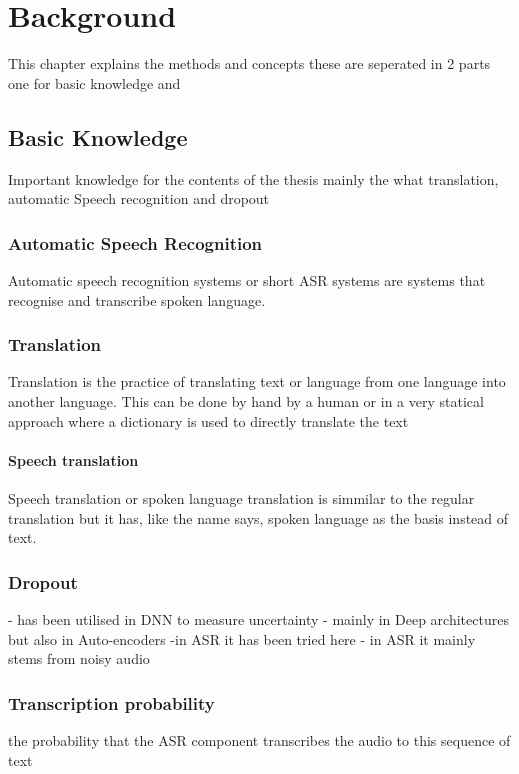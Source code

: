 \chapter{Background}
This chapter explains the methods and concepts these are seperated in 2 parts one for basic knowledge and 

\section{Basic Knowledge}
Important knowledge for the contents of the thesis mainly the what translation, automatic Speech recognition and dropout


\subsection{Automatic Speech Recognition}
Automatic speech recognition systems or short ASR systems are systems that recognise and transcribe spoken language. 

\subsection{Translation}
Translation is the practice of translating text or language from one language into another language. This can be done by hand by a human or in a very statical approach where a dictionary is used to directly translate the text 
\subsubsection{Speech translation}
Speech translation or spoken language translation is simmilar to the regular translation but it has, like the name says, spoken language as the basis instead of text. 


\subsection{Dropout}
- has been utilised in DNN to measure uncertainty
- mainly in Deep architectures but also in Auto-encoders
-in ASR it has been tried here  \cite{8683086}
- in ASR it mainly stems from noisy audio 


\subsection{Transcription probability}
the probability that the ASR component transcribes the audio to this sequence of text


